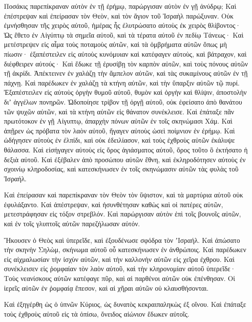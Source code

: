 \begin{spacing}{1.1}
\begin{multicols}{2}
Ποσάκις παρεπίκραναν αὐτὸν ἐν τῇ ἐρήμῳ, παρώργισαν
αὐτὸν ἐν γῇ ἀνύδρῳ; Καὶ ἐπέστρεψαν καὶ ἐπείρασαν τὸν Θεὸν, καὶ τὸν ἅγιον τοῦ Ἰσραὴλ παρώξυναν.
Οὐκ ἐμνήσθησαν τῆς χειρὸς αὐτοῦ, ἡμέρας ἧς ἐλυτρώσατο αὐτοὺς ἐκ χειρὸς θλίβοντος·
Ὡς ἔθετο ἐν Αἰγύπτῳ τὰ σημεῖα αὐτοῦ, καὶ τὰ
τέρατα αὐτοῦ ἐν πεδίῳ Τάνεως· Καὶ μετέστρεψεν εἰς αἷμα τοὺς ποταμοὺς αὐτῶν, καὶ τὰ ὀμβρήματα αὐτῶν ὅπως μὴ πίωσιν·
ἐξαπέστειλεν εἰς αὐτοὺς κυνόμυιαν καὶ κατέφαγεν αὐτοὺς, καὶ βάτραχον, καὶ διέφθειρεν αὐτούς·
Καὶ ἔδωκε τῇ ἐρυσίβῃ τὸν καρπὸν αὐτῶν, καὶ τοὺς πόνους αὐτῶν τῇ ἀκρίδι.
Ἀπέκτεινεν ἐν χαλάζῃ τὴν ἄμπελον αὐτῶν, καὶ τὰς συκαμίνους αὐτῶν ἐν
τῇ πάχνῃ. Καὶ παρέδωκεν ἐν χαλάζῃ τὰ κτήνη αὐτῶν, καὶ τὴν ὕπαρξιν αὐτῶν τῷ πυρί.
Ἐξαπέστειλεν εἰς αὐτοὺς ὀργὴν θυμοῦ αὐτοῦ, θυμὸν καὶ ὀργὴν καὶ θλίψιν, ἀποστολὴν διʼ
ἀγγέλων πονηρῶν. Ὡδοποίησε τρίβον τῇ ὀργῇ αὐτοῦ, οὐκ ἐφείσατο ἀπὸ θανάτου τῶν ψυχῶν αὐτῶν, καὶ τὰ κτήνη αὐτῶν
εἰς θάνατον συνέκλεισε. Καὶ ἐπάταξε πᾶν πρωτότοκον ἐν γῇ Αἰγυπτῳ, ἀπαρχὴν πόνων αὐτῶν ἐν τοῖς σκηνώμασι Χάμ.
Καὶ ἀπῇρεν ὡς πρόβατα τὸν λαὸν αὐτοῦ, ἤγαγεν αὐτοὺς ὡσεὶ
ποίμνιον ἐν ἐρήμῳ. Καὶ ὡδήγησεν αὐτοὺς ἐν ἐλπίδι, καὶ οὐκ ἐδειλίασον, καὶ τοὺς ἐχθροὺς αὐτῶν ἐκάλυψε θάλασσα.
Καὶ εἰσήγαγεν αὐτοὺς εἰς ὄρος ἁγιάσματος αὐτοῦ, ὄρος τοῦτο ὃ
ἐκτήσατο ἡ δεξιὰ αὐτοῦ. Καὶ ἐξέβαλεν ἀπὸ προσώπου αὐτῶν ἔθνη, καὶ ἐκληροδότησεν αὐτοὺς ἐν σχοινίῳ κληροδοσίας, καὶ κατεσκήνωσεν ἐν τοῖς σκηνώμασιν αὐτῶν τὰς φυλὰς τοῦ Ἰσραήλ.

Καὶ ἐπείρασαν καὶ παρεπίκραναν τὸν Θεὸν τὸν ὕψιστον, καὶ τὰ μαρτύρια αὐτοῦ οὐκ ἐφυλάξαντο.
Καὶ ἀπέστρεψαν, καὶ ἠσυνθέτησαν καθὼς καὶ οἱ πατέρες αὐτῶν, μετεστράφησαν εἰς τόξον στρεβλόν.
Καὶ παρώργισαν αὐτὸν ἐπὶ τοῖς βουνοῖς αὐτῶν, καὶ ἐν τοῖς γλυπτοῖς αὐτῶν παρεζήλωσαν αὐτόν.

Ἤκουσεν ὁ Θεὸς καὶ ὑπερεῖδε, καὶ ἐξουδένωσε σφόδρα τὸν
ʼΙσραήλ. Καὶ ἀπώσατο τὴν σκηνὴν Σηλὼμ, σκήνωμα αὐτοῦ
οὗ κατεσκήνωσεν ἐν ἀνθρώποις. Καὶ παρέδωκεν εἰς αἰχμαλωσίαν τὴν ἰσχὺν αὐτῶν, καὶ τὴν καλλονὴν αὐτῶν εἰς χεῖρα
ἐχθρου. Καὶ συνέκλεισεν εἰς ῥομφαίαν τὸν λαὸν αὐτοῦ, καὶ τὴν κληρονομίαν αὐτοῦ ὑπερεῖδε·
Τοὺς νεανίσκους αὐτῶν κατέφαγε πῦρ, καὶ αἱ παρθένοι αὐτῶν οὐκ ἐπένθησαν. Οἱ
ἱερεῖς αὐτῶν ἐν ῥομφαίᾳ ἔπεσον, καὶ αἱ χῆραι αὐτῶν οὐ κλαυσθήσονται.

Καὶ ἐξηγέρθη ὡς ὁ ὑπνῶν Κύριος, ὡς δυνατὸς κεκραιπαληκὼς
ἐξ οἴνου. Καὶ ἐπάταξε τοὺς ἐχθροὺς αὐτοῦ εἰς τὰ ὀπίσω, ὄνειδος αἰώνιον ἔδωκεν αὐτοῖς.


\end{multicols}
\end{spacing}
